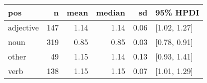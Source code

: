 
\begin{tabular}[t]{lrrrrl}
\toprule
pos & n & mean & median & sd & 95\% HPDI\\
\midrule
adjective & 147 & 1.14 & 1.14 & 0.06 & {}[1.02, 1.27]\\
noun & 319 & 0.85 & 0.85 & 0.03 & {}[0.78, 0.91]\\
other & 49 & 1.15 & 1.14 & 0.13 & {}[0.93, 1.41]\\
verb & 138 & 1.15 & 1.15 & 0.07 & {}[1.01, 1.29]\\
\bottomrule
\end{tabular}
